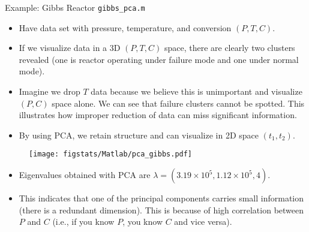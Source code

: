 \documentclass[9pt]{beamer}
\begin{document}
%
\begin{frame}{Example: Gibbs Reactor \footnotesize{\texttt{gibbs\_pca.m}}}

\begin{itemize}
\setlength{\itemsep}{3pt}
\item Have data set with pressure, temperature, and conversion $(P,T,C)$.
\item If we visualize data in a 3D $(P,T,C)$ space, there are clearly two clusters revealed (one is reactor operating under failure mode and one under normal mode).
\item Imagine we drop $T$ data because we believe this is unimportant and visualize $(P,C)$ space alone. We can see that   failure clusters cannot be spotted. This illustrates how improper reduction of data can miss significant information. 
\item By using PCA, we retain structure and can visualize in 2D space $(t_1,t_2)$.
\end{itemize}

\begin{figure}[!htb]
    \centering
	\texttt{[image: figstats/Matlab/pca\_gibbs.pdf]}
\end{figure}

\begin{itemize}
\item Eigenvalues obtained with PCA are $\lambda=(3.19\times 10^5,1.12\times 10^5,4)$. 
\item This indicates that one of the principal components carries small information (there is a redundant dimension). This is because of high correlation between $P$ and $C$ (i.e., if you know $P$, you know $C$ and vice versa). 
\end{itemize}


\end{frame}
\end{document}

